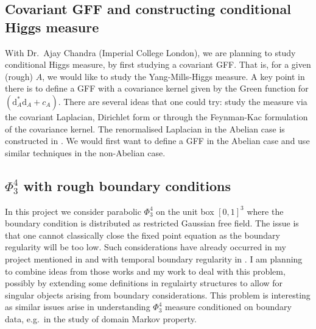 \documentclass[12pt]{article}
\numberwithin{equation}{section}
\theoremstyle{definition}
\theoremstyle{remark}
\newcommand{\diff}{\mathrm{d}}
\newcommand{\1}{\mathbf 1}
\newcommand{\<}{\langle}
\renewcommand{\>}{\rangle}
\newcommand{\bT}{\mathbb T}
\begin{document}


\subsection{Covariant GFF and constructing conditional Higgs measure}
With Dr.\ Ajay Chandra (Imperial College London), we are planning to study conditional Higgs measure, by first studying a covariant GFF. That is, for a given (rough) $A$, we would like to study the Yang-Mills-Higgs measure. A key point in there is to define a GFF with 
a covariance kernel given by the Green function for $(\diff_A^*\diff_A+c_A)$. There are several ideas that one could try: study the measure via the covariant Laplacian, Dirichlet form or through the Feynman-Kac formulation of the covariance kernel. The renormalised Laplacian in the Abelian case is constructed in \cite{MM22}. We would first want to define a GFF in the Abelian case and use similar techniques in the non-Abelian case. 


\subsection{$\Phi^4_3$ with rough boundary conditions}
In this project we consider parabolic $\Phi^4_3$ on the unit box $[0,1]^3$ where the boundary condition is distributed as restricted Gaussian free field. The issue is that one cannot classically close the fixed point equation as the boundary regularity will be too low. Such considerations have already occurred in my project mentioned in  and with temporal boundary regularity in  \cite{CCHS3d,CM24}. I am planning to combine ideas from those works and my work to deal with this problem, possibly by extending some definitions in regulairty structures to allow for singular objects arising from boundary considerations. This problem is interesting as similar issues arise in understanding $\Phi^4_3$ measure conditioned on boundary data, e.g.\ in the study of domain Markov property.
\end{document}
